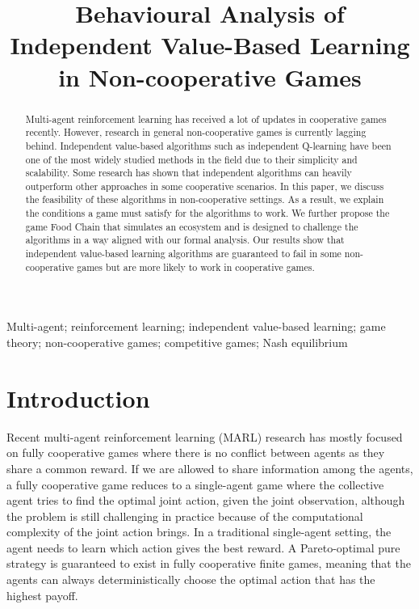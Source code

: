 \documentclass[]{interact}
\theoremstyle{plain}%
\theoremstyle{definition}
\theoremstyle{remark}
\begin{document}

\title{Behavioural Analysis of Independent Value-Based Learning in Non-cooperative Games}

\author{
}

\maketitle

\begin{abstract}
Multi-agent reinforcement learning has received a lot of updates in cooperative games recently. However, research in general non-cooperative games is currently lagging behind. Independent value-based algorithms such as independent Q-learning have been one of the most widely studied methods in the field due to their simplicity and scalability. Some research has shown that independent algorithms can heavily outperform other approaches in some cooperative scenarios. In this paper, we discuss the feasibility of these algorithms in non-cooperative settings. As a result, we explain the conditions a game must satisfy for the algorithms to work. We further propose the game Food Chain that simulates an ecosystem and is designed to challenge the algorithms in a way aligned with our formal analysis. Our results show that independent value-based learning algorithms are guaranteed to fail in some non-cooperative games but are more likely to work in cooperative games.
\end{abstract}

\begin{keywords}
Multi-agent; reinforcement learning; independent value-based learning; game theory; non-cooperative games; competitive games; Nash equilibrium
\end{keywords}

\section{Introduction}
Recent multi-agent reinforcement learning (MARL) research has mostly focused on fully cooperative games \cite{yu2020benchmarking, papoudakis2020benchmarking, zhu2024survey} where there is no conflict between agents as they share a common reward. If we are allowed to share information among the agents, a fully cooperative game reduces to a single-agent game where the collective agent tries to find the optimal joint action, given the joint observation, although the problem is still challenging in practice because of the computational complexity of the joint action brings. In a traditional single-agent setting, the agent needs to learn which action gives the best reward. A Pareto-optimal pure strategy is guaranteed to exist in fully cooperative finite games, meaning that the agents can always deterministically choose the optimal action that has the highest payoff.
\end{document}
